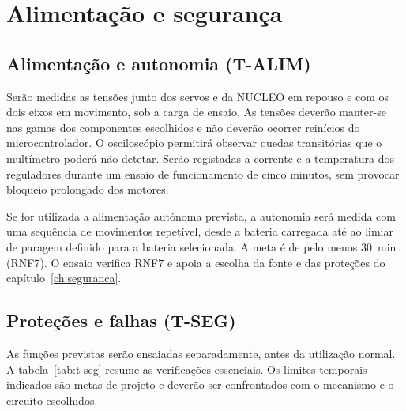 \section{Alimentação e segurança}
\subsection{Alimentação e autonomia (T-ALIM)}
Serão medidas as tensões junto dos servos e da NUCLEO em repouso e com os dois eixos em movimento, sob a carga de ensaio. As tensões deverão manter-se nas gamas dos componentes escolhidos e não deverão ocorrer reinícios do microcontrolador. O osciloscópio permitirá observar quedas transitórias que o multímetro poderá não detetar. Serão registadas a corrente e a temperatura dos reguladores durante um ensaio de funcionamento de cinco minutos, sem provocar bloqueio prolongado dos motores.

Se for utilizada a alimentação autónoma prevista, a autonomia será medida com uma sequência de movimentos repetível, desde a bateria carregada até ao limiar de paragem definido para a bateria selecionada. A meta é de pelo menos \SI{30}{\minute} (RNF7). O ensaio verifica RNF7 e apoia a escolha da fonte e das proteções do capítulo~\ref{ch:seguranca}.

\subsection{Proteções e falhas (T-SEG)}
As funções previstas serão ensaiadas separadamente, antes da utilização normal. A tabela~\ref{tab:t-seg} resume as verificações essenciais. Os limites temporais indicados são metas de projeto e deverão ser confrontados com o mecanismo e o circuito escolhidos.

